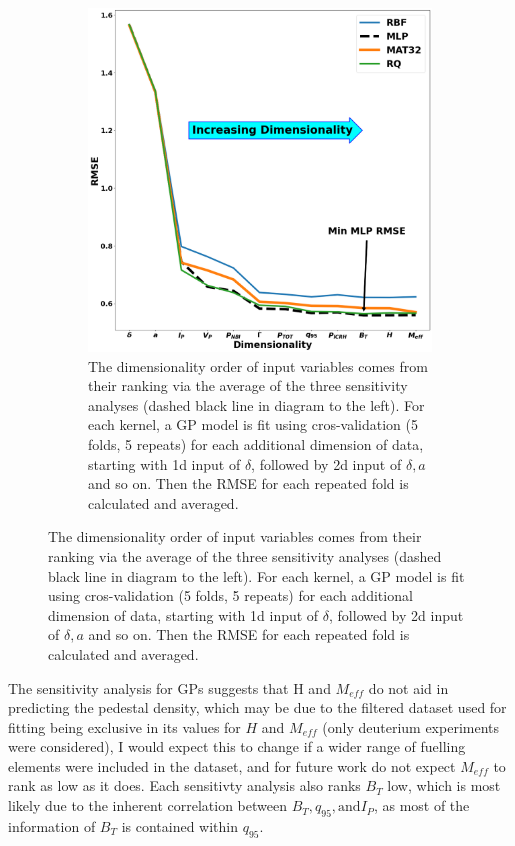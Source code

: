 \documentclass[a4paper, twoside, final, 12pt]{article}
\begin{document}
{\begin{figure}
\begin{subfigure}{0.48\linewidth}
		\label{subfig:ARD_KL_VAR}
	\end{subfigure}\hfill
	\begin{subfigure}{0.48\linewidth}
		\centering
		\includegraphics[scale=0.2]{ ./src/final_GP_dim_v2}
		\caption{The dimensionality order of input variables comes from their ranking via the average of the three sensitivity analyses (dashed black line in diagram to the left). For each kernel, a GP model is fit using cros-validation (5 folds, 5 repeats) for each additional dimension of data, starting with 1d input of $\delta$, followed by 2d input of $\delta, a$ and so on. Then the RMSE for each repeated fold is calculated and averaged.  }
		\label{subfig:GP_vs_dimensionality}
	\end{subfigure}
\end{figure}
The sensitivity analysis for GPs suggests that H and $M_{eff}$ do not aid in predicting the pedestal density, which may be due to the filtered dataset used for fitting being exclusive in its values for $H$ and $M_{eff}$ (only deuterium experiments were considered), 
I would expect this to change if a wider range of fuelling elements were included in the dataset, and for future work do not expect $M_{eff}$ to rank as low as it does. Each sensitivty analysis also ranks $B_T$ low, which is most likely due to the inherent correlation between $B_T, q_{95}, \text{and} I_P$, as most of the information of $B_T$ is contained within $q_{95}$. 

}
\end{document}
